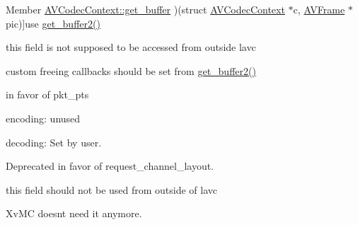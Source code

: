 \begin{DoxyRefList}
\hypertarget{deprecated__deprecated000017}{}%
Member \hyperlink{struct_a_v_codec_context_abc3a806b73306162efa218510448d54f}{A\+V\+Codec\+Context\+:\+:get\+\_\+buffer} )(struct \hyperlink{struct_a_v_codec_context}{A\+V\+Codec\+Context} $\ast$c, \hyperlink{struct_a_v_frame}{A\+V\+Frame} $\ast$pic)]use \hyperlink{struct_a_v_codec_context_aef79333a4c6abf1628c55d75ec82bede}{get\+\_\+buffer2()}  
\item[\label{deprecated__deprecated000023}%
\hypertarget{deprecated__deprecated000023}{}%
Member \hyperlink{struct_a_v_codec_context_a664ccfc97e45f52d4086759431f0c1fa}{A\+V\+Codec\+Context\+:\+:pkt} ]this field is not supposed to be accessed from outside lavc  
\item[\label{deprecated__deprecated000018}%
\hypertarget{deprecated__deprecated000018}{}%
Member \hyperlink{struct_a_v_codec_context_ac934a388c7779e800c13914ff00b6916}{A\+V\+Codec\+Context\+:\+:release\+\_\+buffer} )(struct \hyperlink{struct_a_v_codec_context}{A\+V\+Codec\+Context} $\ast$c, \hyperlink{struct_a_v_frame}{A\+V\+Frame} $\ast$pic)]custom freeing callbacks should be set from \hyperlink{struct_a_v_codec_context_aef79333a4c6abf1628c55d75ec82bede}{get\+\_\+buffer2()}  
\item[\label{deprecated__deprecated000020}%
\hypertarget{deprecated__deprecated000020}{}%
Member \hyperlink{struct_a_v_codec_context_a64c09907902b41744c3ea60c89fd42fb}{A\+V\+Codec\+Context\+:\+:reordered\+\_\+opaque} ]in favor of pkt\+\_\+pts
\begin{DoxyItemize}
\item encoding\+: unused
\item decoding\+: Set by user.  
\end{DoxyItemize}
\item[\label{deprecated__deprecated000016}%
\hypertarget{deprecated__deprecated000016}{}%
Member \hyperlink{struct_a_v_codec_context_a5ad41beeb47aeedd84d1e81dc2ad40e2}{A\+V\+Codec\+Context\+:\+:request\+\_\+channels} ]Deprecated in favor of request\+\_\+channel\+\_\+layout.  
\item[\label{deprecated__deprecated000021}%
\hypertarget{deprecated__deprecated000021}{}%
Member \hyperlink{struct_a_v_codec_context_aeed57307d47f36a39905f206eee8dd96}{A\+V\+Codec\+Context\+:\+:thread\+\_\+opaque} ]this field should not be used from outside of lavc  
\item[\label{deprecated__deprecated000015}%
\hypertarget{deprecated__deprecated000015}{}%
Member \hyperlink{struct_a_v_codec_context_a358503f8848e8a496fc3de96ba62643a}{A\+V\+Codec\+Context\+:\+:xvmc\+\_\+acceleration} ]Xv\+MC doesn\textquotesingle{}t need it anymore.  

\end{DoxyRefList}
